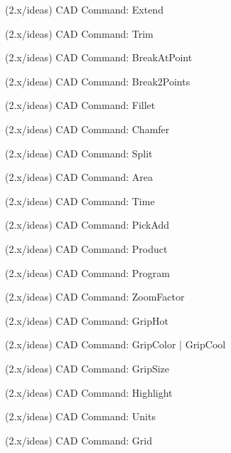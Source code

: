 \begin{DoxyRefList}
\label{todo__todo000284}%
%
(2.\+x/ideas) CAD Command\+: Extend

\label{todo__todo000285}%
%
(2.\+x/ideas) CAD Command\+: Trim

\label{todo__todo000286}%
%
(2.\+x/ideas) CAD Command\+: Break\+At\+Point

\label{todo__todo000287}%
%
(2.\+x/ideas) CAD Command\+: Break2\+Points

\label{todo__todo000288}%
%
(2.\+x/ideas) CAD Command\+: Fillet

\label{todo__todo000289}%
%
(2.\+x/ideas) CAD Command\+: Chamfer

\label{todo__todo000290}%
%
(2.\+x/ideas) CAD Command\+: Split

\label{todo__todo000291}%
%
(2.\+x/ideas) CAD Command\+: Area

\label{todo__todo000292}%
%
(2.\+x/ideas) CAD Command\+: Time

\label{todo__todo000293}%
%
(2.\+x/ideas) CAD Command\+: Pick\+Add

\label{todo__todo000294}%
%
(2.\+x/ideas) CAD Command\+: Product

\label{todo__todo000295}%
%
(2.\+x/ideas) CAD Command\+: Program

\label{todo__todo000296}%
%
(2.\+x/ideas) CAD Command\+: Zoom\+Factor

\label{todo__todo000297}%
%
(2.\+x/ideas) CAD Command\+: Grip\+Hot

\label{todo__todo000298}%
%
(2.\+x/ideas) CAD Command\+: Grip\+Color $|$ Grip\+Cool

\label{todo__todo000299}%
%
(2.\+x/ideas) CAD Command\+: Grip\+Size

\label{todo__todo000300}%
%
(2.\+x/ideas) CAD Command\+: Highlight

\label{todo__todo000301}%
%
(2.\+x/ideas) CAD Command\+: Units

\label{todo__todo000302}%
%
(2.\+x/ideas) CAD Command\+: Grid


\end{DoxyRefList}
